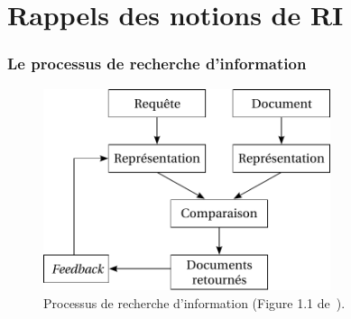 \documentclass[11pt,aspectratio=43,dvipsnames,table]{beamer}
\begin{document}
\section{Rappels des notions de RI}


\begin{frame}
    \frametitle{Le processus de recherche d'information}
    \begin{figure}
    \centering
    \includegraphics[width=0.75\textwidth]{img/typicalIR.pdf}
    \caption{Processus de recherche d'information (Figure 1.1 
             de~\cite{DBLP:series/synthesis/2010Nie}).}
    \end{figure}
\end{frame}
\end{document}
